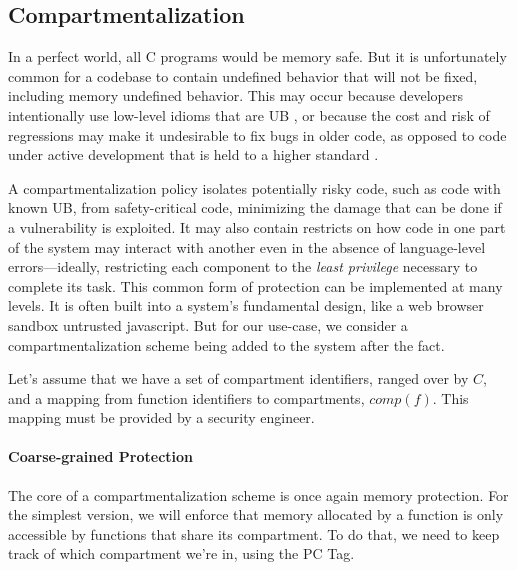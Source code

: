 \documentclass{llncs}
\begin{document}
\subsection{Compartmentalization}
\label{sec:comp}
In a perfect world, all C programs would be memory safe. But it is unfortunately common
for a codebase to contain undefined behavior that will not be fixed, including memory undefined
behavior. This may occur because developers intentionally use low-level idioms that are UB
\cite{Memarian16:DeFacto}, or because the cost and risk of regressions may make it
undesirable to fix bugs in older code,
as opposed to code under active development that is held to a higher standard \cite{Bessey10:Coverity}.

A compartmentalization policy isolates potentially risky code, such as code with known UB,
from safety-critical code, minimizing the damage that can be done if a vulnerability is exploited.
It may also contain restricts on how code in one part of the system may interact with another
even in the absence of language-level errors---ideally, restricting each component to the
{\em least privilege} necessary to complete its task.
This common form of protection can be implemented at many levels. It is often built
into a system's fundamental design, like a web browser sandbox untrusted javascript.
But for our use-case, we consider a compartmentalization scheme being added to the system
after the fact.

Let's assume that we have a set of compartment identifiers, ranged over by \(C\), and a mapping
from function identifiers to compartments, \(\mathit{comp}(f)\). This mapping must be provided by
a security engineer.

\paragraph{Coarse-grained Protection}

%
The core of a compartmentalization scheme is once again memory protection. For the simplest version,
we will enforce that memory allocated by a function is only accessible by functions that share its
compartment. To do that, we need to keep track of which compartment we're in, using the PC Tag.
\end{document}

